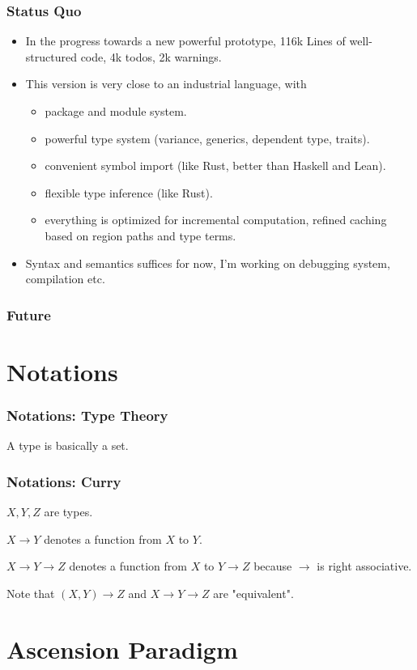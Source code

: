 \documentclass{beamer}   	%
\theoremstyle{definition}
\begin{document}
\begin{frame}
\frametitle{Status Quo}
\begin{itemize}
	\item In the progress towards a new powerful prototype, 116k Lines of well-structured code, 4k todos, 2k warnings.
	\item This version is very close to an industrial language, with
	\begin{itemize}
		\item package and module system.
		\item powerful type system (variance, generics, dependent type, traits).
		\item convenient symbol import (like Rust, better than Haskell and Lean).
		\item flexible type inference (like Rust).
		\item everything is optimized for incremental computation, refined caching based on region paths and type terms.
	\end{itemize}
	\item Syntax and semantics suffices for now, I'm working on debugging system, compilation etc.
\end{itemize}
\end{frame}

\begin{frame}
\frametitle{Future}
\end{frame}

\section{Notations}

\begin{frame}
\frametitle{Notations: Type Theory}

A type is basically a set.
\end{frame}

\begin{frame}
\frametitle{Notations: Curry}
	$X, Y, Z$ are types.

	$X \to Y$ denotes a function from $X$ to $Y$.

	$X \to Y \to Z$ denotes a function from $X$ to $Y\to Z$ because $\to$ is right associative.

	Note that $(X, Y)\to Z$ and $X \to Y \to Z$ are "equivalent".
\end{frame}

\section{Ascension Paradigm}
\end{document}
